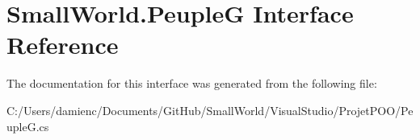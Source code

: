 \hypertarget{interface_small_world_1_1_peuple_g}{\section{Small\-World.\-Peuple\-G Interface Reference}
\label{interface_small_world_1_1_peuple_g}
}


The documentation for this interface was generated from the following file\-:\begin{DoxyCompactItemize}
\item 
C\-:/\-Users/damienc/\-Documents/\-Git\-Hub/\-Small\-World/\-Visual\-Studio/\-Projet\-P\-O\-O/Peuple\-G.\-cs\end{DoxyCompactItemize}
